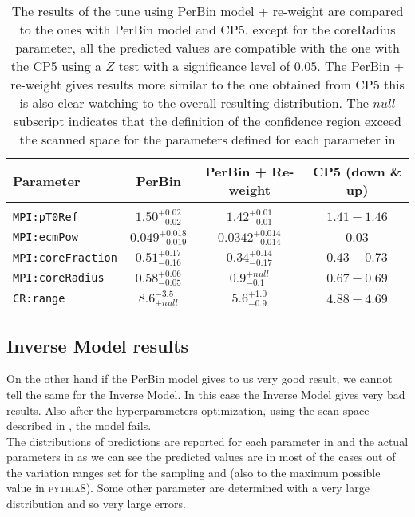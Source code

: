 \begin{table}[H]
\centering
	\begin{tabular}{l | c | c | c }
		Parameter & PerBin & PerBin + Re-weight & CP5 (down \& up)\\ \hline\hline
		\\[-0.85em]		
\texttt{MPI:pT0Ref} & $ 1.50^{+0.02}_{-0.02}$ & $ 1.42_{-0.01}^{+0.01} $ & $1.41 - 1.46$\\[3pt]
\texttt{MPI:ecmPow} & $ 0.049_{-0.019}^{+0.018} $ & $ 0.0342_{-0.014}^{+0.014} $ & $0.03$\\[3pt]
\texttt{MPI:coreFraction} & $ 0.51_{-0.16}^{+0.17} $ & $ 0.34_{-0.17}^{+0.14} $ & $0.43 - 0.73$\\[3pt]
\texttt{MPI:coreRadius} & $ 0.58_{-0.05}^{+0.06} $ & $ 0.9_{-0.1}^{+null} $ & $0.67 - 0.69$\\[3pt]
\texttt{CR:range} & $ 8.6 ^{-3.5}_{+null} $ & $ 5.6_{-0.9}^{+1.0} $ & $4.88 - 4.69$\\[2pt]
\end{tabular}
\caption{The results of the tune using PerBin model + re-weight are compared to the ones with PerBin model and CP5. except for the coreRadius parameter, all the predicted values are compatible with the one with the CP5 using a $Z$ test with a significance level of $0.05$. The PerBin + re-weight gives results more similar to the one obtained from CP5 this is also clear watching to the overall resulting distribution. The $null$ subscript indicates that the definition of the confidence region exceed the scanned space for the parameters defined for each parameter in }
\label{table:result_PerBin_5params_rew}
\end{table}

\clearpage
\subsection{Inverse Model results}

On the other hand if the PerBin model gives to us very good result, we cannot tell the same for the Inverse Model. In this case the Inverse Model gives very bad results. Also after the hyperparameters optimization, using the scan space described in , the model fails.
\\
The distributions of predictions are reported for each parameter in  and the actual parameters in  as we can see the predicted values are in most of the cases out of the variation ranges set for the sampling and (also to the maximum possible value in \textsc{pythia8}). 
Some other parameter are determined with a very large distribution and so very large errors. 


